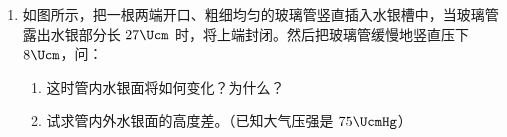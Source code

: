 \documentclass[\gkver]{gaokaozhenti}
\begin{document}
\begin{enumerate}
{$mg\sin\alpha-f=ma$　（1）（1 分）

$N-mg\cos\alpha=0$　（2）

其中 $\alpha$ 是斜面的倾角，由题中已知条件有：$\sin\alpha=\frac{h}{l}=0.60$，$\cos\alpha=0.80$。

由滑动摩擦力公式得：$f=\mu N=\mu mg\cos\alpha$　（3）（1 分）

代入得：$mg\sin\alpha-\mu mg\cos\alpha=ma$　（4）（1 分）

解得：$a=(\sin\alpha-\mu\cos\alpha)g=(0.60-0.30\times0.80)\times10\Umsq=3.6\Umsq$。（1 分）

（如直接写出（4）式也给 3 分。）

（2）解：木块沿斜面滑下时做匀加速运动，设所需时间为 $t$，由运动学公式 $s=\frac{1}{2}at^{2}$（1 分）

得 $t=\sqrt{\frac{2s}{a}}=\sqrt{\frac{2\times5.0}{3.6}}\Us$（1 分）

$=1.7\Us$（或 $\frac{5}{3}\Us$）（1 分）
}

\item
如图所示，把一根两端开口、粗细均匀的玻璃管竖直插入水银槽中，当玻璃管露出水银部分长 $27\Ucm$ 时，将上端封闭。然后把玻璃管缓慢地竖直压下 $8\Ucm$，问：
\begin{enumerate}
	\item
	这时管内水银面将如何变化？为什么？
	\item
	试求管内外水银面的高度差。（已知大气压强是 $75\UcmHg$）
\end{enumerate}
\onepicture[align=right, w=4.46cm]{}


\end{enumerate}
\end{document}
